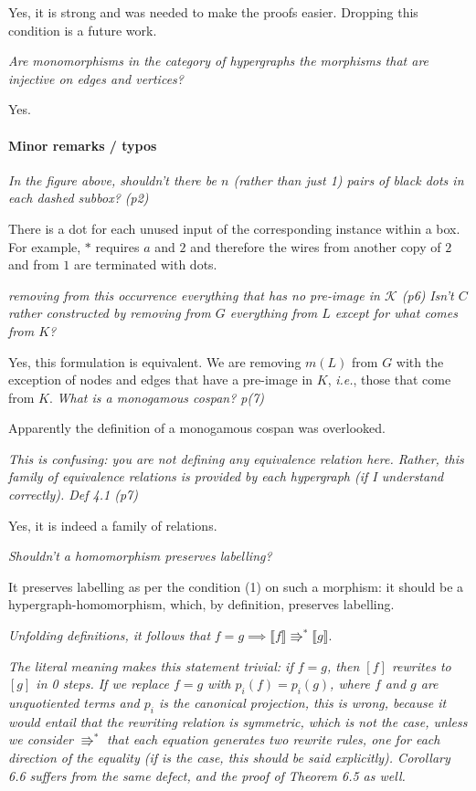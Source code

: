 \documentclass{article}
\begin{document}
Yes, it is strong and was needed to make the proofs easier. 
Dropping this condition is a future work.

\textit{Are monomorphisms in the category of hypergraphs the morphisms that are
injective on edges and vertices?}

Yes.

\paragraph{Minor remarks / typos}

\textit{In the figure above, shouldn't there be $n$ (rather than just 1) pairs of black
dots in each dashed subbox? (p2)}

There is a dot for each unused input of the corresponding instance within a box.
For example, $*$ requires $a$ and $2$ and therefore the wires from another copy of $2$ and from $1$ are terminated with dots.

\textit{removing from this occurrence everything that has no pre-image in $\mathcal{K}$ (p6)}
\textit{Isn't $C$ rather constructed by removing from $G$ everything from $L$ except for what
comes from $K$?}

Yes, this formulation is equivalent. We are removing $m(L)$ from $G$ with the exception of nodes and edges that have a pre-image in $K$, \textit{i.e.}, those that come from $K$.
\textit{What is a monogamous cospan? p(7)}

Apparently the definition of a monogamous cospan was overlooked.

\textit{This is confusing: you are not defining any equivalence relation here. Rather, 
this family of equivalence relations is provided by each hypergraph (if I
understand correctly). Def 4.1 (p7)}

Yes, it is indeed a family of relations.

\textit{Shouldn't a homomorphism preserves labelling?}

It preserves labelling as per the condition (1) on such a morphism: it should be a hypergraph-homomorphism, which, by definition, preserves labelling.

\textit{Unfolding definitions, it follows that}
$f = g \implies \llbracket f \rrbracket \Rrightarrow^{*} \llbracket g \rrbracket$.

\textit{The literal meaning makes this statement trivial: if $f = g$, then $[f]$ rewrites to
$[g]$ in 0 steps.
If we replace $f = g$ with $p_i(f) = p_i(g)$, where $f$ and $g$ are unquotiented terms and
$p_i$ is the canonical projection, this is wrong, because it would entail that the
rewriting relation is symmetric, which is not the case, unless we consider} $\Rrightarrow^{*}$
\textit{that each equation generates two rewrite rules, one for each direction of the
equality (if is the case, this should be said explicitly). Corollary 6.6 suffers
from the same defect, and the proof of Theorem 6.5 as well.}
\end{document}

